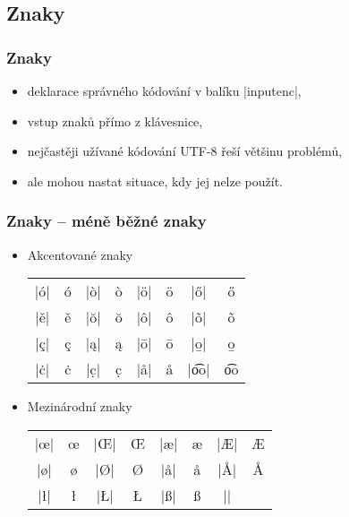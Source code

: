 \subsection{Znaky}
\begin{frame}[fragile]
	\frametitle{Znaky}
	\begin{itemize}
		\item deklarace správného kódování v balíku |inputenc|,
		\item vstup znaků přímo z klávesnice,
		\item nejčastěji užívané kódování UTF-8 řeší většinu problémů,
		\item ale mohou nastat situace, kdy jej nelze použít.
	\end{itemize}
\end{frame}


\begin{frame}[fragile]
	\frametitle{Znaky -- méně běžné znaky}
	\begin{itemize}
		\item Akcentované znaky
			\begin{center}
				\begin{tabular}{*{8}{c}}
					|\'{o}| & \'{o} & |\`{o}| & \`{o} & |\"{o}| & \"{o} & |\H{o}| & \H{o}\\
					|\v{e}| & \v{e} & |\u{o}| & \u{o} & |\^{o}| & \^{o} & |\~{o}| & \~{o}\\
					|\c{c}| & \c{c} & |\k{a}| & \k{a} & |\={o}| & \={o} & |\b{o}| & \b{o}\\
					|\.{c}| & \.{c} & |\d{c}| & \d{c} & |\r{a}| & \r{a} & |\t{oo}| & \t{oo}\\
				\end{tabular}
			\end{center}
		\item Mezinárodní znaky
			\begin{center}
				\begin{tabular}{*{8}{c}}
					|\oe| & \oe & |\OE| & \OE & |\ae| & \ae & |\AE| & \AE\\
					|\o| & \o & |\O| & \O & |\aa| & \aa & |\AA| & \AA\\
					|\l| & \l & |\L| & \L & |\ss| & \ss & |\SS| & \SS\\
				\end{tabular}
			\end{center}
	\end{itemize}
\end{frame}


